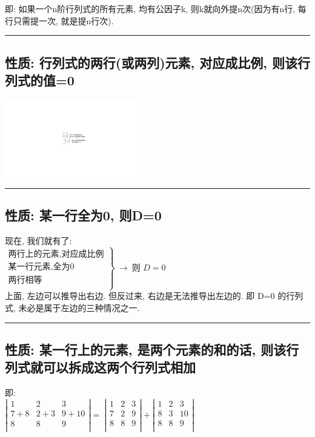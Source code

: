 \documentclass[UTF8]{ctexart}
\begin{document}
	即: 如果一个n阶行列式的所有元素, 均有公因子k, 则k就向外提n次(因为有n行, 每行只需提一次, 就是提n行次). \\
		
	\hrule
	
	\subsection{性质: 行列式的两行(或两列)元素, 对应成比例, 则该行列式的值=0}

\includegraphics[width=0.45\textwidth]{img/0009.pdf}\\
	
	\hrule
	
	
	\subsection{性质: 某一行全为0, 则D=0 }
	现在, 我们就有了: \\
	
	$
	\left. \begin{array}{r}
		\text{两行上的元素,对应成比例}\\
		\text{某一行元素,全为}0\\
		\text{两行相等}\\
	\end{array} \right\} \ →\ \text{则\ }D=0
	$\\
	
	上面, 左边可以推导出右边. 但反过来, 右边是无法推导出左边的. 即 D=0 的行列式, 未必是属于左边的三种情况之一. \\
	
	\hrule
	
	\subsection{性质: 某一行上的元素, 是两个元素的和的话, 则该行列式就可以拆成这两个行列式相加}
	即:\\
	$
	\left| \begin{matrix}
		1&		2&		3\\
		7+8&		2+3&		9+10\\
		8&		8&		9\\
	\end{matrix} \right|=\ \left| \begin{matrix}
		1&		2&		3\\
		7&		2&		9\\
		8&		8&		9\\
	\end{matrix} \right|+\left| \begin{matrix}
		1&		2&		3\\
		8&		3&		10\\
		8&		8&		9\\
	\end{matrix} \right|
	$\\
	
\end{document}
